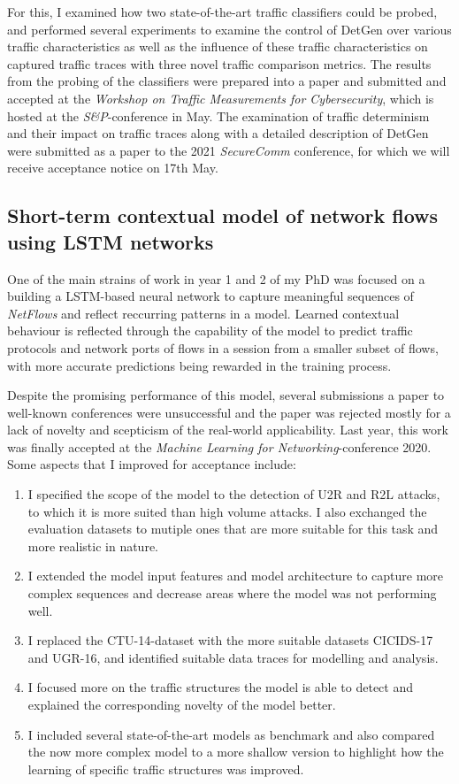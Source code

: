 \documentclass[a4paper,12pt,twoside]{article}
\begin{document}
For this, I examined how two state-of-the-art traffic classifiers could be probed, and performed several experiments to examine the control of DetGen over various traffic characteristics as well as the influence of these traffic characteristics on captured traffic traces with three novel traffic comparison metrics. The results from the probing of the classifiers were prepared into a paper and submitted and accepted at the \textit{Workshop on Traffic Measurements for Cybersecurity}, which is hosted at the \textit{S\&P}-conference in May. The examination of traffic determinism and their impact on traffic traces along with a detailed description of DetGen were submitted as a paper to the 2021 \textit{SecureComm} conference, for which we will receive acceptance notice on 17th May.


\subsection{Short-term contextual model of network flows using LSTM networks}\label{Sec:Short-term}

One of the main strains of work in year 1 and 2 of my PhD was focused on a building a LSTM-based neural network to capture meaningful sequences of \textit{NetFlows} and reflect reccurring patterns in a model. Learned contextual behaviour is reflected through the capability of the model to predict traffic protocols and network ports of flows in a session from a smaller subset of flows, with more accurate predictions being rewarded in the training process.

Despite the promising performance of this model, several submissions a paper to well-known conferences were unsuccessful and the paper was rejected mostly for a lack of novelty and scepticism of the real-world applicability. Last year, this work was finally accepted at the \textit{Machine Learning for Networking}-conference 2020. Some aspects that I improved for acceptance include:

\begin{enumerate}
\item I specified the scope of the model to the detection of U2R and R2L attacks, to which it is more suited than high volume attacks. I also exchanged the evaluation datasets to mutiple ones that are more suitable for this task and more realistic in nature.
\item I extended the model input features and model architecture to capture more complex sequences and decrease areas where the model was not performing well.
\item I replaced the CTU-14-dataset with the more suitable datasets CICIDS-17 and UGR-16, and identified suitable data traces for modelling and analysis. 
\item I focused more on the traffic structures the model is able to detect and explained the corresponding novelty of the model better. 
\item I included several state-of-the-art models as benchmark and also compared the now more complex model to a more shallow version to highlight how the learning of specific traffic structures was improved.
\end{enumerate}
\end{document}
